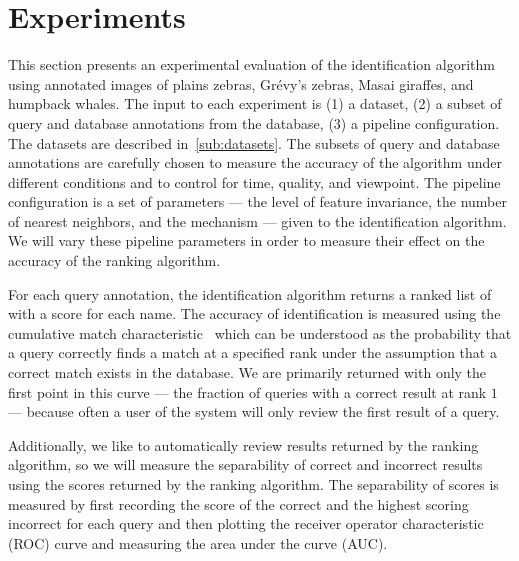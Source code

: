 
\section{Experiments}\label{sec:experiments}

    This section presents an experimental evaluation of the identification algorithm using annotated images of
      plains zebras, Grévy's zebras, Masai giraffes, and humpback whales.
    The input to each experiment is
    (1) a dataset,
    (2) a subset of query and database annotations from the database,
    (3) a pipeline configuration.
    The datasets are described in~\cref{sub:datasets}.
    The subsets of query and database annotations are carefully chosen to measure the accuracy of the algorithm
      under different conditions and to control for time, quality, and viewpoint.
    The pipeline configuration is a set of parameters --- \eg{} the level of feature invariance, the number of
      nearest neighbors, and the \namescoring{} mechanism --- given to the identification algorithm.
    We will vary these pipeline parameters in order to measure their effect on the accuracy of the ranking
      algorithm.

    For each query annotation, the identification algorithm returns a ranked list of \names{} with a score for
      each name.
    The accuracy of identification is measured using the cumulative match
      characteristic~\cite{decann_relating_2013} which can be understood as the probability that a query correctly
      finds a match at a specified rank under the assumption that a correct match exists in the database.
    We are primarily returned with only the first point in this curve --- the fraction of queries with a correct
      result at rank $1$ --- because often a user of the system will only review the first result of a query.

    Additionally, we like to automatically review results returned by the ranking algorithm, so we will measure
      the separability of correct and incorrect results using the scores returned by the ranking algorithm.
    The separability of scores is measured by first recording the score of the correct \name{} and the
      highest scoring incorrect \name{} for each query and then plotting the receiver operator characteristic
      (ROC) curve and measuring the area under the curve (AUC).

